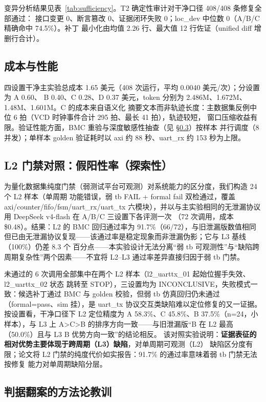 \documentclass[twocolumn,10pt]{ctexart}
\begin{document}
变异分析结果见表~\ref{tab:sufficiency}。T2 确定性审计对干净口径 408/408 条修复全部通过：
接口变更 0、断言篡改 0、证据闭环失败 0；loc\_dev 中位数 0（A/B/C 精确命中 74.5\%）。补丁
最小化由均值 2.26 行、最大值 12 行佐证（unified diff 增删行合计）。

\subsection{成本与性能}\label{sec:cost}

四设置干净主实验总成本 1.65 美元（408 次运行，平均 0.0040 美元/次）；分设置为 A 0.60、
B 0.40、C 0.28、D 0.37 美元，token 分别为 2.486M、1.672M、1.48M、1.601M。C 的成本来自语义化
摘要文本而非轨迹长度：主数据集反例中位 6 拍（VCD 时钟事件合计 295 拍、最长 41 拍），轨迹较短，
窗口压缩收益有限。验证性能方面，BMC 重验与深度敏感性抽查（见 \S\ref{sec:judgment}）按样本
并行调度（8 并发）；单样本 golden 验证耗时以 axi 约 88 秒、uart\_rx 约 153 秒为上限。

\subsection{L2 门禁对照：假阳性率（探索性）}\label{sec:l2}

为量化数据集纯度门禁（弱测试平台可观测）对系统能力的区分度，我们构造 24 个 L2 样本（单周期
功能错误，弱 tb FAIL + formal fail 双检通过，覆盖 axi/counter/fifo/fsm/uart\_rx/uart\_tx
六模块），并以与主实验相同的无泄漏协议用 DeepSeek v4-flash 在 A/B/C 三设置下各评测一次
（72 次调用，成本 \$0.48）。结果：L2 的 BMC 回归通过率为 91.7\%（66/72），与旧泄漏版数值相同
但已由无泄漏协议复现——该通过率是稳定现象而非泄漏伪影；它与 L3 基线（100\%）仍差 8.3 个
百分点——本实验设计无法分离“弱 tb 可观测性”与“缺陷跨周期复杂性”两个因素——不宜将 L2--L3
通过率差异直接归因于弱 tb 门禁。

未通过的 6 次调用全部集中在两个 L2 样本（l2\_uarttx\_01 起始位握手失效、l2\_uarttx\_02 状态
跳转至 STOP），三设置均为 INCONCLUSIVE，失败模式一致：候选补丁通过 BMC 与 golden 校验，但弱
tb 仿真回归仍未通过（formal=pass、sim 挂），是 uart\_tx 协议交互类缺陷难以定位修复的又一证据。
按设置看，干净口径下 L2 定位精度为 A 58.3\%、C 45.8\%、B 37.5\%（n=24，小样本），与 L3 上
A>C>B 的排序方向一致——与旧泄漏版“B 在 L2 最高（50.0\%）且与 L3 B 优势方向一致”的结论相反。
该对照实验说明：\textbf{证据表征的相对优势主要体现于跨周期（L3）缺陷}，对单周期可观测（L2）
缺陷区分度有限；论文将 L2 门禁的纯度代价如实报告：91.7\% 的通过率意味着弱 tb 门禁无法按修复
能力对单周期缺陷分层。

\subsection{判据翻案的方法论教训}\label{sec:judgment}
\end{document}
